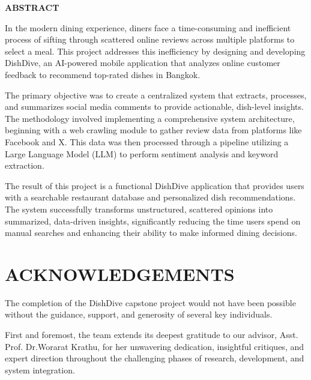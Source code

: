\vspace{1.5cm}
\begin{center}\textbf{\large ABSTRACT}\end{center}
{}
\begingroup
\setlength{\parindent}{2em}
\setlength{\parskip}{0pt}
\leavevmode\hspace*{\parindent}In the modern dining experience, diners face a time-consuming and inefficient process of sifting through scattered online reviews across multiple platforms to select a meal. This project addresses this inefficiency by designing and developing DishDive, an AI-powered mobile application that analyzes online customer feedback to recommend top-rated dishes in Bangkok.

The primary objective was to create a centralized system that extracts, processes, and summarizes social media comments to provide actionable, dish-level insights. The methodology involved implementing a comprehensive system architecture, beginning with a web crawling module to gather review data from platforms like Facebook and X. This data was then processed through a pipeline utilizing a Large Language Model (LLM) to perform sentiment analysis and keyword extraction.

The result of this project is a functional DishDive application that provides users with a searchable restaurant database and personalized dish recommendations. The system successfully transforms unstructured, scattered opinions into summarized, data-driven insights, significantly reducing the time users spend on manual searches and enhancing their ability to make informed dining decisions.
\par\endgroup


\cleardoublepage
\chapter*{ACKNOWLEDGEMENTS}
{}
\setlength{\parindent}{2em}
\indent The completion of the DishDive capstone project would not have been possible
without the guidance, support, and generosity of several key individuals.

       First and foremost, the team extends its deepest gratitude to our advisor, Asst. Prof.
Dr.Worarat Krathu, for her unwavering dedication, insightful critiques, and expert direction
throughout the challenging phases of research, development, and system integration.

